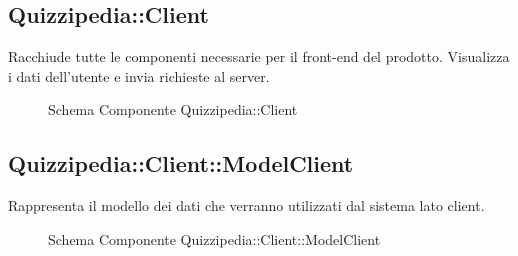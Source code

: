 \subsection{Quizzipedia::Client}
Racchiude tutte le componenti necessarie per il front-end del prodotto. Visualizza i dati dell'utente e invia richieste al server.
\begin{figure}[H]
\centering
\noindent{}
\caption[Schema Componente Client]{Schema Componente Quizzipedia::Client}
\end{figure}
\subsection{Quizzipedia::Client::ModelClient}
Rappresenta il modello dei dati che verranno utilizzati dal sistema lato client.
\begin{figure}[H]
\centering
\noindent{}
\caption[Schema Componente Quizzipedia::Client::ModelClient]{Schema Componente Quizzipedia::Client::ModelClient}
\end{figure}
